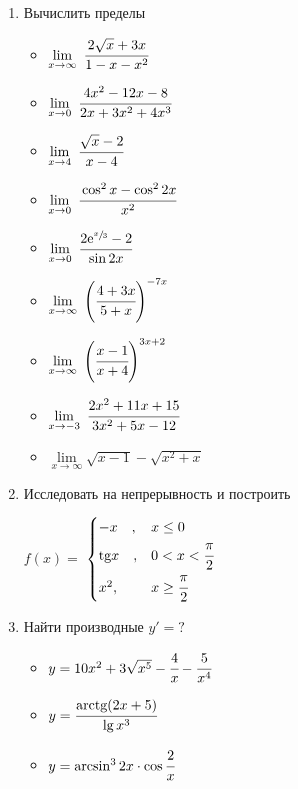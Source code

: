 \documentclass{article}
\begin{document}
\begin{multicols}{2}
	\begin{enumerate}[label=\arabic*.]
		\item Вычислить пределы
		\begin{multicols}{3}
			\begin{itemize}[label="",leftmargin=0cm]
				\item $\lim\limits_{x \to \infty}\ \cfrac{2\sqrt{x} + 3x}{1-x-x^2}$
				\item $\lim\limits_{x \to 0}\ \cfrac{4x^2-12x-8}{2x+3x^2+4x^3}$
				\item $\lim\limits_{x \to 4}\ \cfrac{\sqrt{x}-2}{x-4}$
				\vfill\null\columnbreak
				\item $\lim\limits_{x \to 0}\ \cfrac{\cos^2x-\cos^22x}{x^2}$
				\item $\lim\limits_{x \to 0}\ \cfrac{2\mbox{e}^{\sfrac{x}{3}}-2}{\sin 2x}$
				\item $\lim\limits_{x \to \infty}\ \Bigg(\cfrac{4+3x}{5+x}\Bigg)^{-7x}$
				\vfill\null\columnbreak
				\item $\lim\limits_{x \to \infty}\ \Bigg(\cfrac{x-1}{x+4}\Bigg)^{3x+2}$
				\item $\lim\limits_{x \to -3}\ \cfrac{2x^2+11x+15}{3x^2+5x-12}$
				\item $\lim\limits_{x \to \infty} \sqrt{x-1}-\sqrt{x^2+x}$
				\vfill\null\columnbreak
			\end{itemize}
		\end{multicols}
		\vspace{-5mm}
		\item Исследовать на непрерывность и построить
		\begin{multicols}{3}
			$f(x)=$
			$\begin{cases}
			-x \quad, & x \leq 0\\
			\mbox{tg}x \quad, & 0 < x < \cfrac{\pi}{2} \\
			x^2, & x \geq \cfrac{\pi}{2}
			\end{cases}$
			\vfill\null\columnbreak
			\vfill\null\columnbreak
		\end{multicols}
		\vspace{-3mm}
		\item Найти производные $y'=?$
		\begin{multicols}{2}
			\begin{itemize}[label=""]
				\item $y=10x^2+3\sqrt{x^5}-\cfrac{4}{x}-\cfrac{5}{x^4}$
				\item $y=\cfrac{\mbox{arctg} (2x+5)}{\lg x^3}$
				\item $y=\arcsin^32x\cdot\cos\cfrac{2}{x}$

\end{itemize}
\end{multicols}
\end{enumerate}
\end{multicols}
\end{document}
